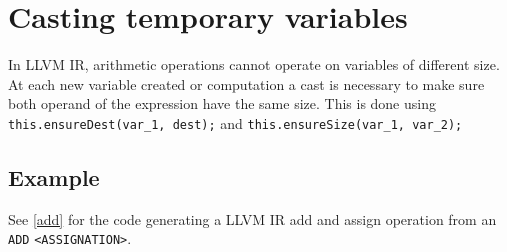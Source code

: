 \section{Casting temporary variables}

In LLVM IR, arithmetic operations cannot operate on variables of different size. At each new variable created or computation a cast is necessary to make sure both operand of the expression have the same size. This is done using \verb!this.ensureDest(var_1, dest);! and \verb!this.ensureSize(var_1, var_2);!

\subsection{Example}
See \ref{add} for the code generating a LLVM IR add and assign operation from an \verb!ADD! \verb!<ASSIGNATION>!.


